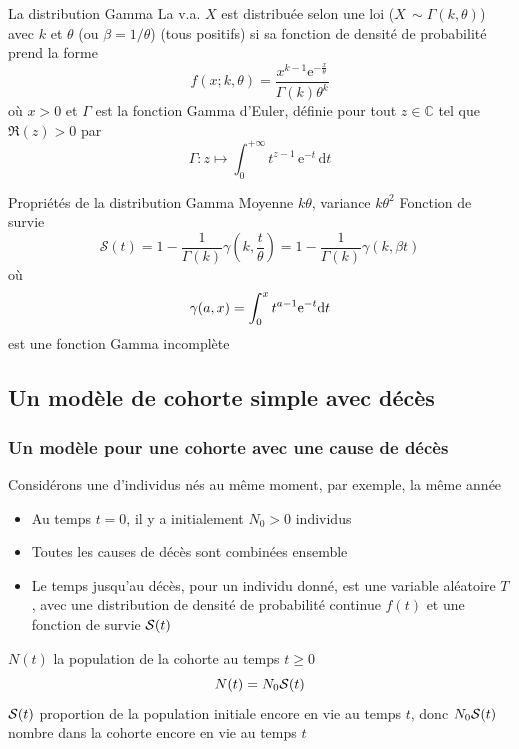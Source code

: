 \documentclass[aspectratio=169]{beamer}\usepackage[]{graphicx}\usepackage[]{xcolor}
\begin{document}
\begin{frame}{La distribution Gamma}
La v.a. $X$ est distribuée selon une loi  ($X\,\sim\Gamma(k, \theta)$) avec  $k$ et  $\theta$ (ou  $\beta = 1/\theta$) (tous positifs) si sa fonction de densité de probabilité prend la forme
\begin{equation}\label{eq:gamma_distrib}
f(x;k,\theta) = \frac{x^{k-1} \mathrm{e}^{-\frac{x}{\theta}}}{\Gamma ( k)\theta ^k}
\end{equation}
où $x>0$ et $\Gamma$ est la fonction Gamma d'Euler, définie pour tout $z\in\mathbb{C}$ tel que $\Re(z) > 0$ par
\[
\Gamma : z \mapsto \int_0^{+\infty}  t^{z-1}\,\mathrm{e}^{-t}\,\mathrm{d}t
\]
\end{frame}

\begin{frame}{Propriétés de la distribution Gamma}
Moyenne $k\theta$, variance $k\theta^2$
\vfill
Fonction de survie
\[
\mathcal{S}(t)=
1-\frac{1}{\Gamma(k)}\gamma\left(
k,\frac{t}{\theta} 
\right)
=1-\frac{1}{\Gamma(k)}\gamma\left(
k,\beta t
\right)
\]
où 
\[
\gamma(a,x)=\int_0^x t^{a-1}{\rm e}^{-t}{\rm d}t
\]
est une fonction Gamma incomplète
\end{frame}





\subsection{Un modèle de cohorte simple avec décès} 

\begin{frame}\frametitle{Un modèle pour une cohorte avec une cause de décès}
Considérons une  d'individus nés au même moment, par exemple, la même année
\vfill
\begin{itemize}
\item Au temps $t=0$, il y a initialement $N_0>0$ individus
\item Toutes les causes de décès sont combinées ensemble 
\item Le temps jusqu'au décès, pour un individu donné, est une variable aléatoire $T$, avec une distribution de densité de probabilité continue $f(t)$ et une fonction de survie $\S(t)$
\end{itemize}
\vfill
$N(t)$ la population de la cohorte au temps $t\geq 0$
\begin{equation}\label{eq:N_general}
N(t)=N_0\S(t)
\end{equation}
\vfill
$\S(t)$ proportion de la population initiale encore en vie au temps $t$, donc $N_0\S(t)$ nombre dans la cohorte encore en vie au temps $t$
\end{frame}
\end{document}
